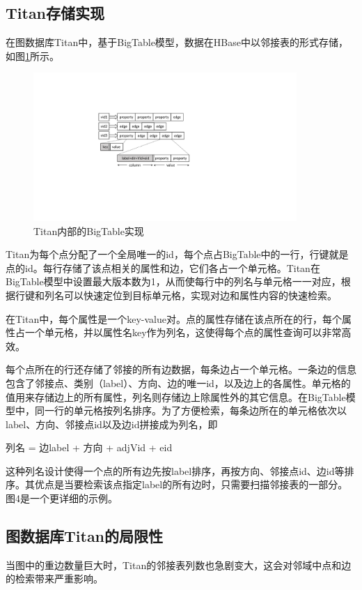 \subsection{Titan存储实现}
在图数据库Titan中，基于BigTable模型，数据在HBase中以邻接表的形式存储，如图\ref{fig:adj_list}所示。

\begin{figure}[htbp]
\centering
\includegraphics[width=100mm]{fig/adj_list.pdf}
\caption{Titan内部的BigTable实现}
\label{fig:adj_list}
\end{figure}

Titan为每个点分配了一个全局唯一的id，每个点占BigTable中的一行，行键就是点的id。每行存储了该点相关的属性和边，它们各占一个单元格。Titan在BigTable模型中设置最大版本数为1，从而使每行中的列名与单元格一一对应，根据行键和列名可以快速定位到目标单元格，实现对边和属性内容的快速检索。

在Titan中，每个属性是一个key-value对。点的属性存储在该点所在的行，每个属性占一个单元格，并以属性名key作为列名，这使得每个点的属性查询可以非常高效。

每个点所在的行还存储了邻接的所有边数据，每条边占一个单元格。一条边的信息包含了邻接点、类别（label）、方向、边的唯一id，以及边上的各属性。单元格的值用来存储边上的所有属性，列名则存储边上除属性外的其它信息。在BigTable模型中，同一行的单元格按列名排序。为了方便检索，每条边所在的单元格依次以label、方向、邻接点id以及边id拼接成为列名，即
\begin{center}
  列名 = 边label + 方向 + adjVid + eid
\end{center}
这种列名设计使得一个点的所有边先按label排序，再按方向、邻接点id、边id等排序。其优点是当要检索该点指定label的所有边时，只需要扫描邻接表的一部分。图4是一个更详细的示例。

\subsection{图数据库Titan的局限性}
当图中的重边数量巨大时，Titan的邻接表列数也急剧变大，这会对邻域中点和边的检索带来严重影响。

